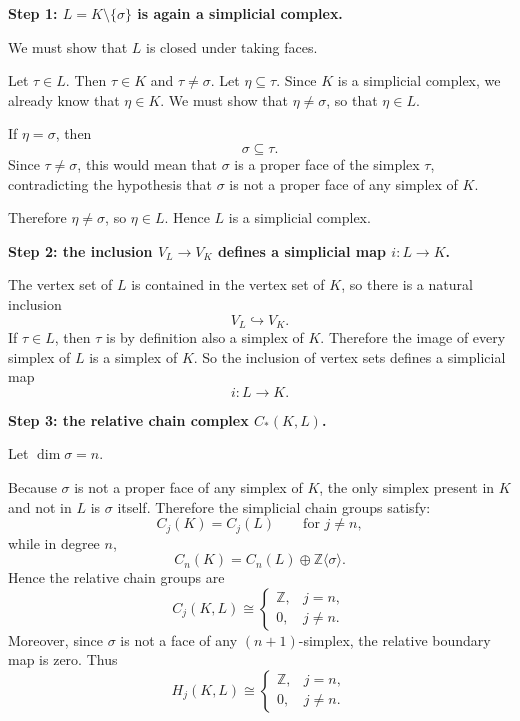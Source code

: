 \begin{solution}
\textbf{Step 1: \(L=K\setminus\{\sigma\}\) is again a simplicial complex.}

We must show that \(L\) is closed under taking faces.

Let \(\tau\in L\). Then \(\tau\in K\) and \(\tau\neq \sigma\). Let \(\eta\subseteq \tau\). Since \(K\) is a simplicial complex, we already know that \(\eta\in K\). We must show that \(\eta\neq \sigma\), so that \(\eta\in L\).

If \(\eta=\sigma\), then
\[
\sigma\subseteq \tau.
\]
Since \(\tau\neq \sigma\), this would mean that \(\sigma\) is a proper face of the simplex \(\tau\), contradicting the hypothesis that \(\sigma\) is not a proper face of any simplex of \(K\).

Therefore \(\eta\neq \sigma\), so \(\eta\in L\). Hence \(L\) is a simplicial complex.

\par

\textbf{Step 2: the inclusion \(V_L\to V_K\) defines a simplicial map \(i:L\to K\).}

The vertex set of \(L\) is contained in the vertex set of \(K\), so there is a natural inclusion
\[
V_L\hookrightarrow V_K.
\]
If \(\tau\in L\), then \(\tau\) is by definition also a simplex of \(K\). Therefore the image of every simplex of \(L\) is a simplex of \(K\). So the inclusion of vertex sets defines a simplicial map
\[
i:L\to K.
\]

\par

\textbf{Step 3: the relative chain complex \(C_*(K,L)\).}

Let \(\dim \sigma = n\).

Because \(\sigma\) is not a proper face of any simplex of \(K\), the only simplex present in \(K\) and not in \(L\) is \(\sigma\) itself. Therefore the simplicial chain groups satisfy:
\[
C_j(K)=C_j(L)\qquad \text{for } j\neq n,
\]
while in degree \(n\),
\[
C_n(K)=C_n(L)\oplus \mathbb Z\langle \sigma\rangle.
\]
Hence the relative chain groups are
\[
C_j(K,L)\cong
\begin{cases}
	\mathbb Z, & j=n,\\
	0, & j\neq n.
\end{cases}
\]
Moreover, since \(\sigma\) is not a face of any \((n+1)\)-simplex, the relative boundary map is zero. Thus
\[
H_j(K,L)\cong
\begin{cases}
	\mathbb Z, & j=n,\\
	0, & j\neq n.
\end{cases}
\]


\end{solution}
